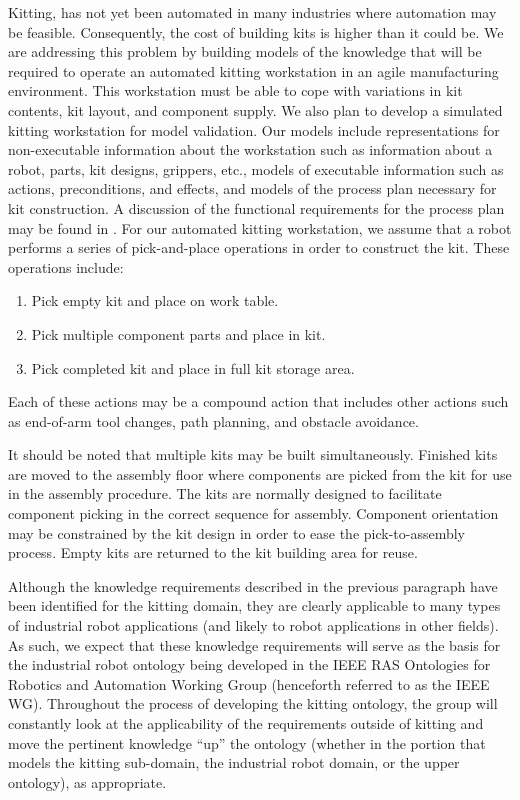 \documentclass[a4paper, 10pt, conference]{ieeeconf}      %
\begin{document}
Kitting, has not yet been automated in many industries where automation may be feasible. Consequently, the cost of building kits is higher than it could be. We are addressing this problem by building models of the knowledge that will be required to operate an automated kitting workstation in an agile manufacturing environment. This workstation must be able to cope with
variations in kit contents, kit layout, and component supply. We also plan to develop a simulated kitting workstation for model validation. Our models
include representations for non-executable information about the workstation such as information about a robot, parts, kit designs, grippers, etc., models of executable information such as actions, preconditions, and effects, and models of the  process plan
necessary for kit construction. A discussion of the functional requirements for the process plan may be found in \cite{Balakirsky2012_1}.
For our automated kitting workstation, we assume that a robot performs a series of pick-and-place operations
in order to construct the kit. These operations include:
\begin{enumerate}
\item Pick empty kit and place on work table.
\item Pick multiple component parts and place in kit.
\item Pick completed kit and place in full kit storage area.
\end{enumerate}
Each of these actions may be a compound action that includes other actions such as end-of-arm tool changes, path planning,
and obstacle avoidance.

It should be noted that multiple kits may be built simultaneously. Finished kits are moved to the assembly floor where components
are picked
from the kit for use in the assembly procedure. The kits are normally designed to facilitate component picking in the correct
sequence for assembly. Component orientation may be constrained by the kit design in order to ease the pick-to-assembly process.
Empty kits are returned to the kit building area for reuse.

Although the knowledge requirements described in the previous paragraph have been identified for the kitting domain, they are clearly applicable to many types of industrial robot applications (and likely to robot applications in other fields). As such, we expect that these knowledge requirements will serve as the basis for the industrial robot ontology being developed in the IEEE  RAS Ontologies for Robotics and Automation Working Group \cite{Madhavan2011} (henceforth referred to as the IEEE WG). Throughout the process of developing the kitting ontology, the group will constantly look at the applicability of the requirements outside of kitting and move the pertinent knowledge ``up'' the ontology (whether in the portion that models the kitting sub-domain, the industrial robot domain, or the upper ontology), as appropriate.
\end{document}
